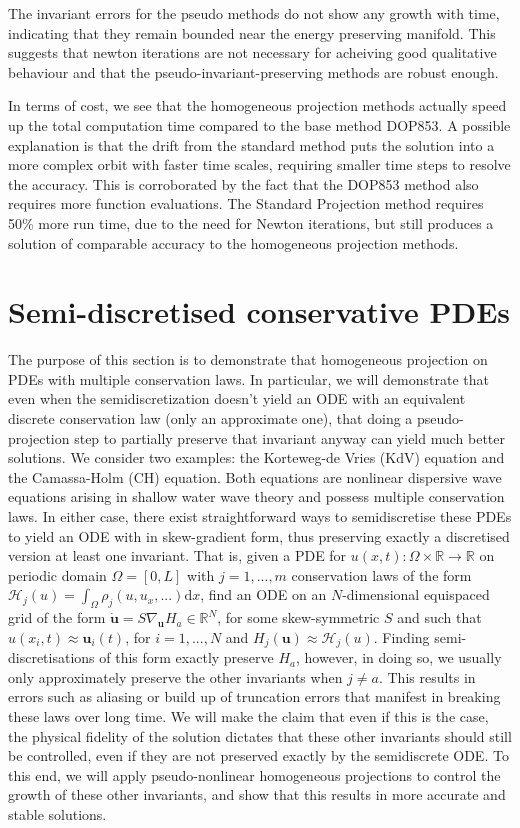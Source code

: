 \documentclass[final,3p,times]{elsarticle}
\newcommand{\R}{\mathbb{R}}
\newcommand{\rd}{\mathrm{d}}
\begin{document}
The invariant errors for the pseudo methods do not show any growth with time, indicating that they remain bounded near the energy preserving manifold. This suggests that newton iterations are not necessary for acheiving good qualitative behaviour and that the pseudo-invariant-preserving methods are robust enough.

In terms of cost, we see that the homogeneous projection methods actually speed up the total computation time compared to the base method DOP853. A possible explanation is that the drift from the standard method puts the solution into a more complex orbit with faster time scales, requiring smaller time steps to resolve the accuracy. This is corroborated by the fact that the DOP853 method also requires more function evaluations. The Standard Projection method requires 50\% more run time, due to the need for Newton iterations, but still produces a solution of comparable accuracy to the homogeneous projection methods. 

\section{Semi-discretised conservative PDEs}
The purpose of this section is to demonstrate that homogeneous projection on PDEs with multiple conservation laws. In particular, we will demonstrate that  even when the semidiscretization doesn't yield an ODE with an equivalent discrete conservation law (only an approximate one), that doing a pseudo-projection step to partially preserve that invariant anyway can yield much better solutions. We consider two examples: the Korteweg-de Vries (KdV) equation and the Camassa-Holm (CH) equation. Both equations are nonlinear dispersive wave equations arising in shallow water wave theory and possess multiple conservation laws. In either case, there exist straightforward ways to semidiscretise these PDEs to yield an ODE with in skew-gradient form, thus preserving exactly a discretised version at least one invariant. That is, given a PDE for $u(x, t):\Omega\times\R\rightarrow\R$ on periodic domain $\Omega=[0,L]$ with $j=1,...,m$ conservation laws of the form $\mathcal{H}_j(u)=\int_\Omega\rho_j(u, u_x,...)\rd x$, find an ODE on an $N$-dimensional equispaced grid of the form $\dot{\mathbf{u}} = S\nabla_{\mathbf{u}}H_a\in\R^N$, for some skew-symmetric $S$ and such that $u(x_i, t)\approx \mathbf{u}_i(t)$, for $i=1,...,N$ and $H_j(\mathbf{u})\approx \mathcal{H}_j(u)$. Finding semi-discretisations of this form exactly preserve $H_a$, however, in doing so, we usually only approximately preserve the other invariants when $j\ne a$. This results in errors such as aliasing or build up of truncation errors that manifest in breaking these laws over long time. We will make the claim that even if this is the case, the physical fidelity of the solution dictates that these other invariants should still be controlled, even if they are not preserved exactly by the semidiscrete ODE. To this end, we will apply pseudo-nonlinear homogeneous projections to control the growth of these other invariants, and show that this results in more accurate and stable solutions. 
\end{document}
